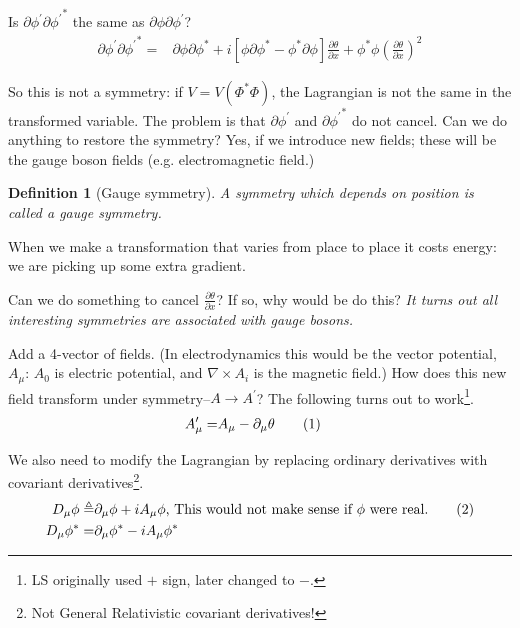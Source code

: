 \documentclass[]{article}
\newcommand\numberthis{\addtocounter{equation}{1}\tag{\theequation}}
\newtheorem{defn}[thm]{Definition}
\begin{document}
Is $\partial \phi^\prime \partial {\phi^\prime}^*$ the same as $\partial \phi \partial {\phi^\prime}$?
\begin{align*}
\partial \phi^\prime \partial {\phi^\prime}^* =&\partial \phi \partial \phi^* + i[\phi \partial \phi^* -\phi^* \partial \phi]\frac{\partial \theta}{\partial x} + \phi^* \phi (\frac{\partial \theta}{\partial x})^2
\end{align*}

So this is not a symmetry: if $V=V(\Phi^*\Phi)$, the Lagrangian is not the same in the transformed variable.  The problem is that $\partial \phi^\prime$ and $\partial {\phi^\prime}^*$ do not cancel. Can we do anything to restore the symmetry? Yes, if we introduce new fields; these will be the gauge boson fields (e.g. electromagnetic field.)

\begin{defn}[Gauge symmetry]
	A symmetry which depends on position is called a gauge symmetry.
\end{defn}

When we make a transformation that varies from place to place it costs energy: we are picking up some extra gradient.

Can we do something to cancel $\frac{\partial \theta}{\partial x}$? If so, why would be do this? \emph{It turns out all interesting symmetries are associated with gauge bosons.}

Add a 4-vector of fields. (In electrodynamics this would be the vector potential, $A_\mu$: $A_0$ is electric potential, and $\nabla \times A_i$ is the magnetic field.) How does this new field transform under symmetry--$A \rightarrow A^\prime$? The following turns out to work\footnote{LS originally used $+$ sign, later changed to $-$.}.
\begin{align*}
	A^\prime_\mu =& A_\mu - \partial_\mu \theta \numberthis \label{eq:gauge:field}
\end{align*}

We also need to modify the Lagrangian by replacing ordinary derivatives with covariant derivatives\footnote{Not General Relativistic covariant derivatives!}.
\begin{align*}
	D_\mu \phi \triangleq& \partial_\mu \phi + i A_\mu \phi \text{, This would not make sense if $\phi$ were real.} \numberthis \label{eq:covariant:derivative}\\
	D_\mu \phi^* =& \partial_\mu \phi^* - i A_\mu \phi^*
\end{align*}
\end{document}
